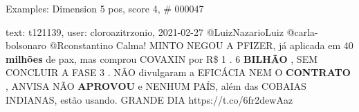 \begin{frame}{Examples: Dimension 5 pos, score 4, \# 000047}
\footnotesize
\begin{exampleblock}{text: t121139, user: cloroazitrzonio, 2021-02-27}
@LuizNazarioLuiz @carla-bolsonaro @Rconstantino Calma! MINTO NEGOU A PFIZER, já 
aplicada em 40 \textbf{milhões} de pax, mas comprou COVAXIN por R\$ 1 . 6 
\textbf{BILHÃO} , SEM CONCLUIR A FASE 3 . NÃO divulgaram a EFICÁCIA NEM O 
\textbf{CONTRATO} , ANVISA NÃO \textbf{APROVOU} e NENHUM PAÍS, além das COBAIAS 
INDIANAS, estão usando. GRANDE DIA  
https://t.co/6fr2dewAaz 
\end{exampleblock}
\end{frame}
